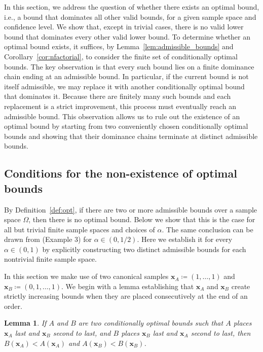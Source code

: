 \documentclass{article}
\newtheorem{lemma}[theorem]{Lemma}
\theoremstyle{definition}
\theoremstyle{remark}
\def\x{\mathbf{x}}
\begin{document}
In this section, we address the question of whether there exists an optimal bound, i.e., a bound that dominates all other valid bounds, for a given sample space and confidence level. We show that, except in trivial cases, there is no valid lower bound that dominates every other valid lower bound. 
To determine whether an optimal bound exists, it suffices, by Lemma~\ref{lem:admissible_bounds} and Corollary~\ref{cor:nfactorial}, to consider the finite set of conditionally optimal bounds. The key observation is that every such bound lies on a finite dominance chain ending at an admissible bound. In particular, if the current bound is not itself admissible, we may replace it with another conditionally optimal bound that dominates it. Because there are finitely many such bounds and each replacement is a strict improvement, this process must eventually reach an admissible bound. This observation allows us to rule out the existence of an optimal bound by starting from two conveniently chosen conditionally optimal bounds and showing that their dominance chains terminate at distinct admissible bounds.

\subsection{Conditions for the non-existence of optimal bounds}

By Definition~\ref{def:opt}, if there are two or more admissible bounds over a sample space $\Omega$, then there is no optimal bound. Below we show that this is the case for all but trivial finite sample spaces and choices of $\alpha$. 
The same conclusion can be drawn from \cite{KabailaLloyd2000} (Example 3) for $\alpha \in (0, 1/2)$. Here we establish it for every $\alpha \in (0, 1)$ by explicitly constructing two distinct admissible bounds for each nontrivial finite sample space.

In this section we make use of two canonical samples $\x_A \coloneqq (1, \ldots, 1)$ and $\x_B \coloneqq (0, 1, \ldots, 1)$. We begin with a lemma establishing that $\x_A$ and $\x_B$ create strictly increasing bounds when they are placed consecutively at the end of an order.

\color{black}
\begin{lemma}
\label{lem:consec_samples}
    If $A$ and $B$ are two conditionally optimal bounds such that $A$ places $\x_A$ last and $\x_B$ second to last, and $B$ places $\x_B$ last and $\x_A$ second to last, then $B(\x_A) < A(\x_A)$ and $A(\x_B) < B(\x_B)$.
\end{lemma}
\end{document}
